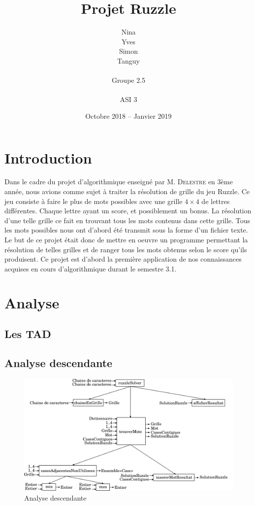 \documentclass[a4paper]{report}
\title{Projet Ruzzle}
\author{
	\Large Nina \noun{Lardière} \\
	\Large Yves \noun{Le Guennec} \\
	\Large Simon \noun{Lebeaud} \\
	\Large Tanguy \noun{Leclerc} \\ \\
	\Large Groupe 2.5 \\ \\
	\Large ASI 3 \\
	}
\date{\Large Octobre 2018 -- Janvier 2019}
\newcommand{\noun}[1]{\textsc{#1}}
\begin{document}
	 \maketitle
	\tableofcontents

	\chapter{Introduction}
	Dans le cadre du projet d'algorithmique enseigné par M. \noun{Delestre} en 3ème année, nous avions comme sujet à traiter la résolution de grille du jeu Ruzzle. Ce jeu consiste à faire le plus de mots possibles avec une grille $4\times4$ de lettres différentes. Chaque lettre ayant un score, et possiblement un bonus. La résolution d'une telle grille ce fait en trouvant tous les mots contenus dans cette grille.
	Tous les mots possibles nous ont d'abord été transmit sous la forme d'un fichier texte. Le but de ce projet était donc de mettre en oeuvre un programme permettant la résolution de telles grilles et de ranger tous les mots obtenus selon le score qu'ils produisent. Ce projet est d'abord la première application de nos connaissances acquises en cours d'algorithmique durant le semestre 3.1.

	\chapter{Analyse}
		\section{Les TAD}
			

		\section{Analyse descendante}
			\begin{figure}[h]
				\centering \includegraphics[width=1\textwidth]{./analyseDescendante/analyseDescendante}
				\caption{\label{fig:AD}Analyse descendante}
			\end{figure}
\end{document}
